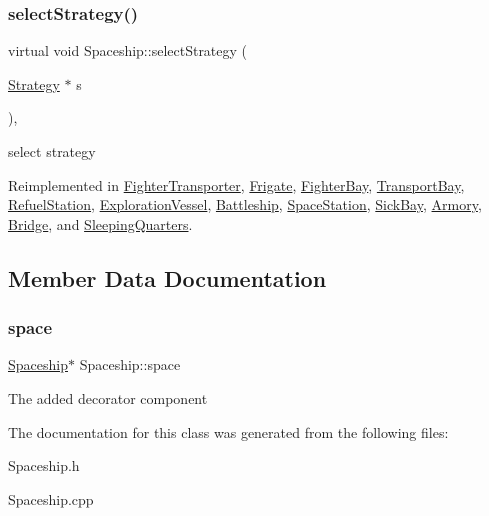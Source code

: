\subsubsection{\texorpdfstring{select\+Strategy()}{selectStrategy()}}
{\footnotesize\ttfamily virtual void Spaceship\+::select\+Strategy (\begin{DoxyParamCaption}\item[{\hyperlink{classStrategy}{Strategy} $\ast$}]{s }\end{DoxyParamCaption})\hspace{0.3cm}{\ttfamily [inline]}, {\ttfamily [virtual]}}

select strategy 

Reimplemented in \hyperlink{classFighterTransporter_af7050ee155b38c4ae45d38d66bc5fc2f}{Fighter\+Transporter}, \hyperlink{classFrigate_a484e16990cddb79fbc51ff29e815fec5}{Frigate}, \hyperlink{classFighterBay_a32655a70f39312f94403d9aada55788b}{Fighter\+Bay}, \hyperlink{classTransportBay_a277ec0488bbafbeef8d25a77dc5576c8}{Transport\+Bay}, \hyperlink{classRefuelStation_a1dfda37915eca25344aa2fdeaacab4b4}{Refuel\+Station}, \hyperlink{classExplorationVessel_aeaec72883c8cc5b951be9dd8f4184515}{Exploration\+Vessel}, \hyperlink{classBattleship_a2a729de36df2648305cb68c9779c9c2e}{Battleship}, \hyperlink{classSpaceStation_adddfe90b720e2b0a8ce5d27a20eb204e}{Space\+Station}, \hyperlink{classSickBay_ac25920ac3e757e289ea25233991fa94e}{Sick\+Bay}, \hyperlink{classArmory_a85d472873bf4ce934c849f7c362f7064}{Armory}, \hyperlink{classBridge_a07283d7cf98c500020b1f91594f48678}{Bridge}, and \hyperlink{classSleepingQuarters_a9a3c4618cd1a852984c0adba025c159f}{Sleeping\+Quarters}.



\subsection{Member Data Documentation}
\mbox{\label{classSpaceship_a0f53795d5f23cc37369cea2e52bd70b1}} 
\subsubsection{\texorpdfstring{space}{space}}
{\footnotesize\ttfamily \hyperlink{classSpaceship}{Spaceship}$\ast$ Spaceship\+::space\hspace{0.3cm}{\ttfamily [protected]}}

The added decorator component 

The documentation for this class was generated from the following files\+:\begin{DoxyCompactItemize}
\item 
Spaceship.\+h\item 
Spaceship.\+cpp\end{DoxyCompactItemize}
